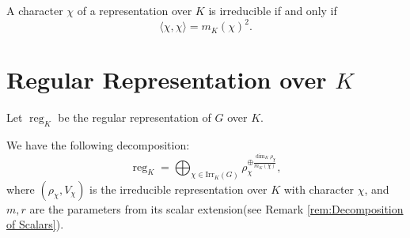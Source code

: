 \begin{cor}
A character \(\chi\) of a representation over \(K\) is irreducible if and only if
\[
\langle \chi, \chi \rangle = m_K(\chi)^2
.\]

\end{cor}



\section{Regular Representation over \(K\)}

Let \(\operatorname{reg}_K\) be the regular representation of \(G\) over \(K\).

\begin{thm}
\label{thm:reg_decomp}
We have the following decomposition:
\[
\operatorname{reg}_K = \bigoplus_{\chi \in \mathrm{Irr}_K(G)} \rho_\chi^{\oplus \frac{\dim_K \rho_\chi}{m_K(\chi)}},
\]
where \((\rho_\chi,V_\chi)\) is the irreducible representation over $K$ with character \(\chi\), and \(m, r\) are the parameters from its scalar extension(see Remark \ref{rem:Decomposition of Scalars}).
\end{thm}

